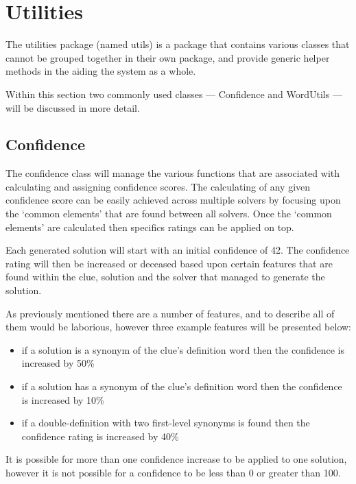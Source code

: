 \section{Utilities}
\label{sec:utilities}

The utilities package (named utils) is a package that contains various classes 
that cannot be grouped together in their own package, and provide generic helper
methods in the aiding the system as a whole.

Within this section two commonly used classes --- Confidence and WordUtils --- 
will be discussed in more detail.


\subsection{Confidence}
\label{sub:confidence}

The confidence class will manage the various functions that are associated with
calculating and assigning confidence scores. The calculating of any given 
confidence score can be easily achieved across multiple solvers by focusing upon
the `common elements' that are found between all solvers. Once the `common 
elements' are calculated then specifics ratings can be applied on top.

Each generated solution will start with an initial confidence of 42. The 
confidence rating will then be increased or deceased based upon certain features
that are found within the clue, solution and the solver that managed to generate
the solution.

As previously mentioned there are a number of features, and to describe all of 
them would be laborious, however three example features will be presented 
below:

\begin{itemize}
  \item if a solution is a synonym of the clue's definition word then the 
        confidence is increased by 50\%
  \item if a solution has a synonym of the clue's definition word then the 
        confidence is increased by 10\%
  \item if a double-definition with two first-level synonyms is found then the
        confidence rating is increased by 40\%
\end{itemize}

It is possible for more than one confidence increase to be applied to one 
solution, however it is not possible for a confidence to be less than 0 or 
greater than 100.


